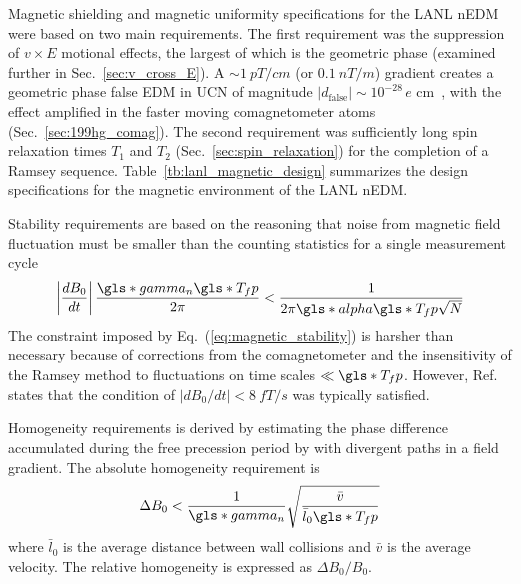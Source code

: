 Magnetic shielding and magnetic uniformity specifications for the LANL nEDM were based on two main requirements. The first requirement was the suppression of $v\times E$ motional effects, the largest of which is the geometric phase (examined further in Sec.~\ref{sec:v_cross_E}). A $\sim\qty{1}{pT\per cm}$ (or $\qty{0.1}{nT\per m}$) gradient creates a geometric phase false EDM in UCN of magnitude $|d_\text{false}|\sim 10^{-28}\,e\text{ cm}$~\cite{lamoreaux_geometric_phase_2005}, with the effect amplified in the faster moving \hg comagnetometer atoms (Sec.~\ref{sec:199hg_comag}). The second requirement was sufficiently long spin relaxation times $T_1$ and $T_2$ (Sec.~\ref{sec:spin_relaxation}) for the completion of a Ramsey sequence. Table~\ref{tb:lanl_magnetic_design} summarizes the design specifications for the magnetic environment of the LANL nEDM.

Stability requirements are based on the reasoning that noise from magnetic field fluctuation must be smaller than the counting statistics for a single measurement cycle~\cite{baker_apparatus_2014}
%
\begin{gather}
    \left| \frac{dB_0}{dt}\right| \frac{\gls*{gamma_n}\gls*{T_fp}}{2\pi} < \frac{1}{2\pi\gls*{alpha}\gls*{T_fp}\sqrt{N}} \label{eq:magnetic_stability}
\end{gather}
%
The constraint imposed by Eq.~(\ref{eq:magnetic_stability}) is harsher than necessary because of corrections from the \hg comagnetometer and the insensitivity of the Ramsey method to fluctuations on time scales $\ll \gls*{T_fp}$. However, Ref.~\cite{baker_apparatus_2014} states that the condition of $|dB_0/dt|<\qty{8}{fT\per s}$ was typically satisfied.

Homogeneity requirements is derived by estimating the phase difference accumulated during the free precession period by \ucn with divergent paths in a field gradient. The absolute homogeneity requirement is ~\cite{baker_apparatus_2014}
%
\begin{gather}
    \Delta B_0 < \frac{1}{\gls*{gamma_n}}\sqrt{\frac{\bar{v}}{\bar{l}_0 \gls*{T_fp}}}
\end{gather}
%
where $\bar{l}_0$ is the average distance between wall collisions and $\bar{v}$ is the average \ucn velocity. The relative homogeneity is expressed as $\Delta B_0/B_0$.

